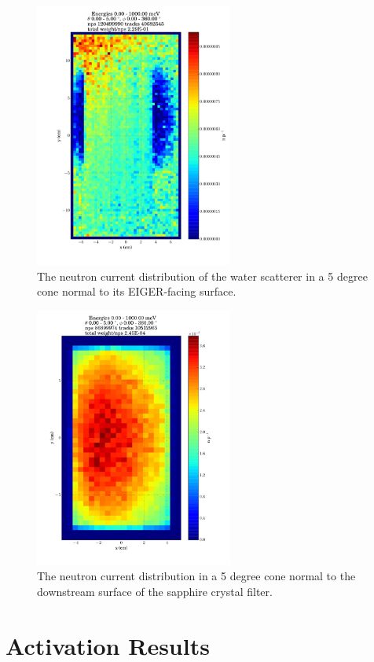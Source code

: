 \documentclass[a4paper,
              ]{jacow}
\begin{document}
\begin{figure}[!htb]
   \centering
   \includegraphics*[trim = 0mm 0mm 0mm 0mm, width=65mm]{graphics/wsdist.pdf}
   \caption{The neutron current distribution of the water scatterer in a 5 degree cone normal to its EIGER-facing surface.}
   \label{wsdist}
\end{figure}

\begin{figure}[!htb]
   \centering
   \includegraphics*[trim = 0mm 0mm 0mm 0mm, width=65mm]{graphics/sappdist.pdf}
   \caption{The neutron current distribution in a 5 degree cone normal to the downstream surface of the sapphire crystal filter.}
   \label{sappdist}
\end{figure}

\section{Activation Results}
\end{document}
